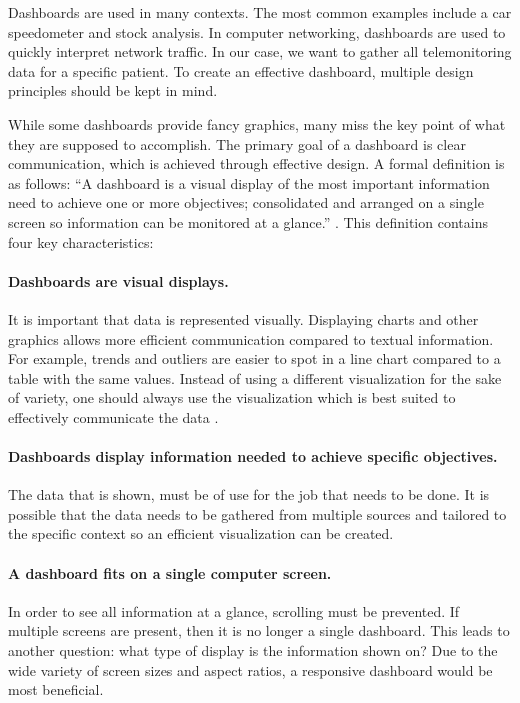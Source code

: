     Dashboards are used in many contexts. The most common examples include a car speedometer and stock analysis. In computer networking, dashboards are used to quickly interpret network traffic. In our case, we want to gather all telemonitoring data for a specific patient. To create an effective dashboard, multiple design principles should be kept in mind.
    
    While some dashboards provide fancy graphics, many miss the key point of what they are supposed to accomplish. The primary goal of a dashboard is clear communication, which is achieved through effective design. A formal definition is as follows: ``A dashboard is a visual display of the most important information need to achieve one or more objectives; consolidated and arranged on a single screen so information can be monitored at a glance.'' \cite{dashboard}. This definition contains four key characteristics:

    \paragraph{Dashboards are visual displays.} It is important that data is represented visually. Displaying charts and other graphics allows more efficient communication compared to textual information. For example, trends and outliers are easier to spot in a line chart compared to a table with the same values. Instead of using a different visualization for the sake of variety, one should always use the visualization which is best suited to effectively communicate the data \cite{few2005intelligent}.

    \paragraph{Dashboards display information needed to achieve specific objectives.} The data that is shown, must be of use for the job that needs to be done. It is possible that the data needs to be gathered from multiple sources and tailored to the specific context so an efficient visualization can be created.

    \paragraph{A dashboard fits on a single computer screen.} In order to see all information at a glance, scrolling must be prevented. If multiple screens are present, then it is no longer a single dashboard. This leads to another question: what type of display is the information shown on? Due to the wide variety of screen sizes and aspect ratios, a responsive dashboard would be most beneficial.

